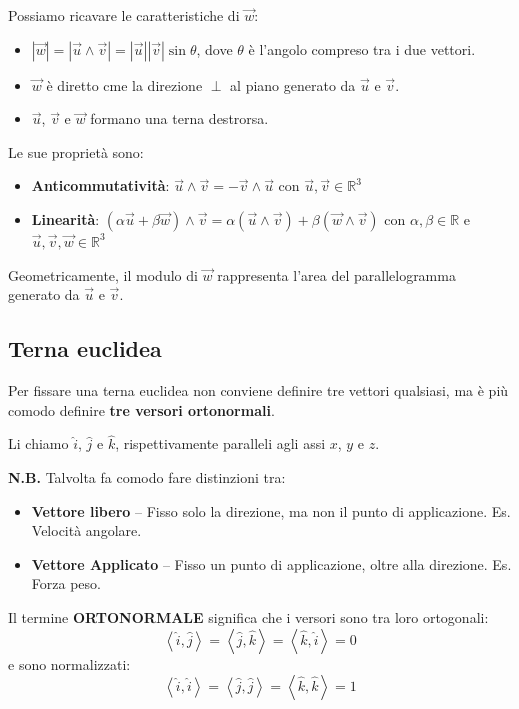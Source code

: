 Possiamo ricavare le caratteristiche di $\vec w$:
\begin{itemize}
    \item $|\vec w| = |\vec u \wedge \vec v| = |\vec u||\vec v|\sin \theta$, dove $\theta$ è l'angolo compreso tra i due vettori.
    \item $\vec w$ è diretto cme la direzione $\perp$ al piano generato da $\vec u$ e $\vec v$.
    \item $\vec u$, $\vec v$ e $\vec w$ formano una terna destrorsa.
\end{itemize}

Le sue proprietà sono:
\begin{itemize}
    \item \textbf{Anticommutatività}: $\vec u \wedge \vec v = - \vec v \wedge \vec u$ con $\vec u, \vec v \in \mathbb{R}^3$
    \item \textbf{Linearità}: $\left( \alpha \vec u + \beta \vec w \right) \wedge \vec v = \alpha \left( \vec u \wedge \vec v \right) + \beta \left( \vec w \wedge \vec v \right)$ con $\alpha, \beta \in \mathbb{R}$ e $\vec u, \vec v, \vec w \in \mathbb{R}^3$
\end{itemize}

Geometricamente, il modulo di $\vec w$ rappresenta l'area del parallelogramma generato da $\vec u$ e $\vec v$.

\subsection{Terna euclidea}
Per fissare una terna euclidea non conviene definire tre vettori qualsiasi, ma è più comodo definire \textbf{tre versori ortonormali}.

Li chiamo $\hat i$, $\hat j$ e $\hat k$, rispettivamente paralleli agli assi $x$, $y$ e $z$.

\textbf{N.B.} Talvolta fa comodo fare distinzioni tra:
\begin{itemize}
    \item \textbf{Vettore libero} -- Fisso solo la direzione, ma non il punto di applicazione. Es. Velocità angolare.
    \item \textbf{Vettore Applicato} -- Fisso un punto di applicazione, oltre alla direzione. Es. Forza peso.
\end{itemize}

Il termine \textbf{ORTONORMALE} significa che i versori sono tra loro ortogonali:
\begin{equation*}
    \left< \hat i, \hat j \right> = \left< \hat j, \hat k \right> = \left< \hat k, \hat i \right> = 0
\end{equation*}
e sono normalizzati:
\begin{equation*}
    \left< \hat i, \hat i \right> = \left< \hat j, \hat j \right> = \left< \hat k, \hat k \right> = 1
\end{equation*}

